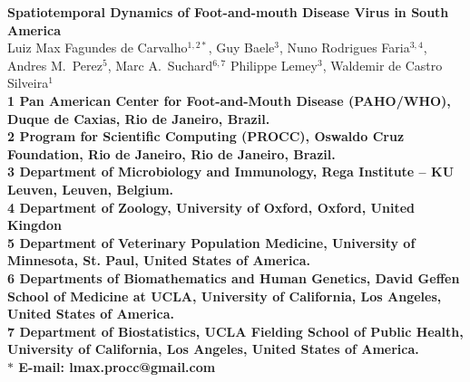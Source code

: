 \documentclass[10pt]{article}
\date{}
\begin{document}
\begin{flushleft}
{\Large
\textbf{Spatiotemporal Dynamics of Foot-and-mouth Disease Virus in South America}
}
\\
Luiz Max Fagundes de Carvalho$^{1,2\ast}$,
Guy Baele$^{3}$,
Nuno Rodrigues Faria$^{3,4}$,
Andres M.~Perez$^{5}$,
Marc A.~Suchard$^{6,7}$
Philippe Lemey$^{3}$,
Waldemir de Castro Silveira$^{1}$
\\
\bf{1} Pan American Center for Foot-and-Mouth Disease (PAHO/WHO), Duque de Caxias, Rio de Janeiro, Brazil.
\\
\bf{2} Program for Scientific Computing (PROCC), Oswaldo Cruz Foundation, Rio de Janeiro, Rio de Janeiro, Brazil.
\\
\bf{3} Department of Microbiology and Immunology, Rega Institute -- KU Leuven, Leuven, Belgium.
\\
\bf{4} Department of Zoology, University of Oxford, Oxford, United Kingdon
\\
\bf{5} Department of Veterinary Population Medicine, University of Minnesota, St. Paul, United States of America.
\\
\bf{6} Departments of Biomathematics and Human Genetics, David Geffen School of Medicine at UCLA, University of California, Los Angeles,  United States of America.\\
\bf{7} Department of Biostatistics, UCLA Fielding School of Public Health, University of California, Los Angeles,  United States of America.
\\
$\ast$ E-mail: lmax.procc@gmail.com
\end{flushleft}

\end{document}
